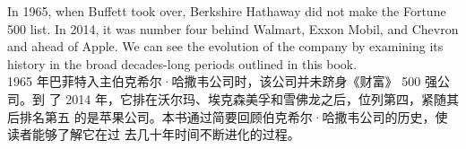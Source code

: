 \begin{verseparallel}
  {
    In 1965, when Buffett took over, Berkshire Hathaway did not make the Fortune
    500 list. In 2014, it
    was number four behind Walmart, Exxon Mobil, and Chevron and ahead of
    Apple.
    We can see the evolution of the company by examining its history in
    the broad decades-long periods outlined in this
    book. \\
  }
  {
    1965 年巴菲特入主伯克希尔·哈撒韦公司时，该公司并未跻身《财富》 500 强公司。到
    了 2014 年，它排在沃尔玛、埃克森美孚和雪佛龙之后，位列第四，紧随其后排名第五
    的是苹果公司。本书通过简要回顾伯克希尔·哈撒韦公司的历史，使读者能够了解它在过
    去几十年时间不断进化的过程。
  }
\end{verseparallel}

